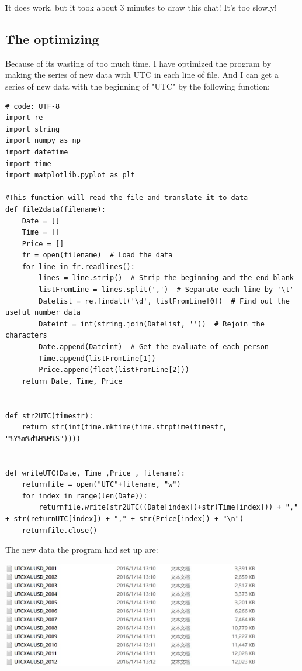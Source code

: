 \documentclass[12pt]{article}
\begin{document}
\H{It does work, but it took about 3 minutes to draw this chat! It's too slowly!}

\subsection{\H The optimizing}
Because of its wasting of too much time, I have optimized the program by making the series of new data with UTC in each line of file. And I can get a series of new data with the beginning of "UTC" by the following function:
\begin{lstlisting}
# code: UTF-8
import re
import string
import numpy as np
import datetime
import time
import matplotlib.pyplot as plt

#This function will read the file and translate it to data
def file2data(filename):
    Date = []
    Time = []
    Price = []
    fr = open(filename)  # Load the data
    for line in fr.readlines():
        lines = line.strip()  # Strip the beginning and the end blank
        listFromLine = lines.split(',')  # Separate each line by '\t'
        Datelist = re.findall('\d', listFromLine[0])  # Find out the useful number data
        Dateint = int(string.join(Datelist, ''))  # Rejoin the characters
        Date.append(Dateint)  # Get the evaluate of each person
        Time.append(listFromLine[1])
        Price.append(float(listFromLine[2]))
    return Date, Time, Price


def str2UTC(timestr):
    return str(int(time.mktime(time.strptime(timestr, "%Y%m%d%H%M%S"))))


def writeUTC(Date, Time ,Price , filename):
    returnfile = open("UTC"+filename, "w")
    for index in range(len(Date)):
        returnfile.write(str2UTC((Date[index])+str(Time[index])) + "," + str(returnUTC[index]) + "," + str(Price[index]) + "\n")
    returnfile.close()
\end{lstlisting}

The new data the program had set up are:

\includegraphics[width = 4.5in]{2.jpg}
\end{document}

